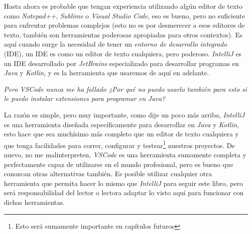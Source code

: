 Hasta ahora es probable que tengan experiencia utilizando algún editor de texto como 
\textit{Notepad++}, \textit{Sublime} o \textit{Visual Studio Code}, eso es bueno, pero no 
suficiente para enfrentar problemas complejos (esto no es por desmerecer a esos editores de 
texto, también son herramientas poderosas apropiadas para otros contextos).
Es aquí cuando surge la necesidad de tener un \textit{entorno de desarrollo integrado} (IDE),
un IDE es como un editor de texto cualquiera, pero poderoso.
\textit{IntelliJ} es un IDE desarrollado por \textit{JetBrains} especializado para desarrollar
programas en \textit{Java} y \textit{Kotlin}, y es la herramienta que usaremos de aquí en
adelante.
\begin{center}
  \textit{
    Pero VSCode nunca me ha fallado ¿Por qué no puedo usarlo también para esto si le puedo 
    instalar extensiones para programar en Java?
  }
\end{center}

La razón es simple, pero muy importante, como dije un poco más arriba, \textit{IntelliJ} es una
herramienta diseñada específicamente para desarrollar en \textit{Java} y \textit{Kotlin}, esto
hace que sea muchísimo más completo que un editor de texto cualquiera y que tenga facilidades para
correr, configurar y testear\footnote{Esto será sumamente importante en capítulos futuros} 
nuestros proyectos.
De nuevo, no me malinterpreten, \textit{VSCode} es una herramienta sumamente completa y 
perfectamente capaz de utilizarse en el mundo profesional, pero es bueno que conozcan otras 
alternativas también.
Es posible utilizar cualquier otra herramienta que permita hacer lo mismo que \textit{IntelliJ}
para seguir este libro, pero será responsabilidad del lector o lectora adaptar lo visto aquí para 
funcionar con dichas herramientas.\footnotemark

